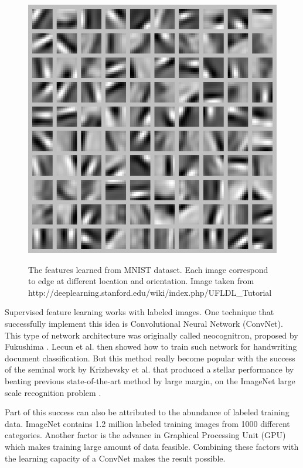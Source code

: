 \documentclass[a4paper,11pt]{kth-mag}
\begin{document}
\begin{figure}[h]
\centering
\includegraphics[scale=0.3]{image/autoencoder.png}
\label{fig:autoencoder}
\caption{The features learned from MNIST dataset. Each image correspond to edge at different location and orientation. Image taken from http://deeplearning.stanford.edu/wiki/index.php/UFLDL\_Tutorial}
\end{figure}

Supervised feature learning works with labeled images. One technique that successfully implement this idea is Convolutional Neural Network (ConvNet). This type of network architecture was originally called neocognitron, proposed by Fukushima \cite{fukushima}. Lecun et al. \cite{lecunn1999} then showed how to train such network for handwriting document classification. But this method really become popular with the success of the seminal work by Krizhevsky et al. \cite{krizhevsky2012cnn} that produced a stellar performance by beating previous state-of-the-art method by large margin, on the ImageNet large scale recognition problem \cite{imagenet}. 

Part of this success can also be attributed to the abundance of labeled training data. ImageNet contains 1.2 million labeled training images from 1000 different categories. Another factor is the advance in Graphical Processing Unit (GPU) which makes training large amount of data feasible. Combining these factors with the learning capacity of a ConvNet makes the result possible.
\end{document}
